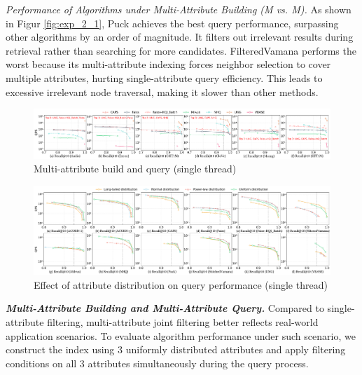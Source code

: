\documentclass[sigconf, nonacm]{acmart}
\begin{document}
\textit{Performance of Algorithms under Multi-Attribute Building (M vs. M).}  
As shown in Figur \ref{fig:exp_2_1}, Puck achieves the best query performance, surpassing other algorithms by an order of magnitude. It filters out irrelevant results during retrieval rather than searching for more candidates. FilteredVamana performs the worst because its multi-attribute indexing forces neighbor selection to cover multiple attributes, hurting single-attribute query efficiency. This leads to excessive irrelevant node traversal, making it slower than other methods.


\begin{figure}
        \centering
        \setlength{\abovecaptionskip}{0cm}
        \setlength{\belowcaptionskip}{-0.4cm}
        \includegraphics[width=\textwidth]{figures/exp/exp_4_1_MultiLabel_1thread.pdf}
        \caption{Multi-attribute build and query (single thread)}
        \label{fig:exp_4_1_MultiLabel_1thread}
\end{figure}

\begin{figure}
        \centering
        \setlength{\abovecaptionskip}{0cm}
        \setlength{\belowcaptionskip}{-0.4cm}
        \includegraphics[width=\textwidth]{figures/exp/exp_3_1.pdf}
        \caption{Effect of attribute distribution on query performance (single thread)}
        \label{fig:exp_3_1}
\end{figure}





\textit{\textbf{Multi-Attribute Building and Multi-Attribute Query.}}  
Compared to single-attribute filtering, multi-attribute joint filtering better reflects real-world application scenarios. To evaluate algorithm performance under such scenario, we construct the index using 3 uniformly distributed attributes and apply filtering conditions on all 3 attributes simultaneously during the query process.
\end{document}

